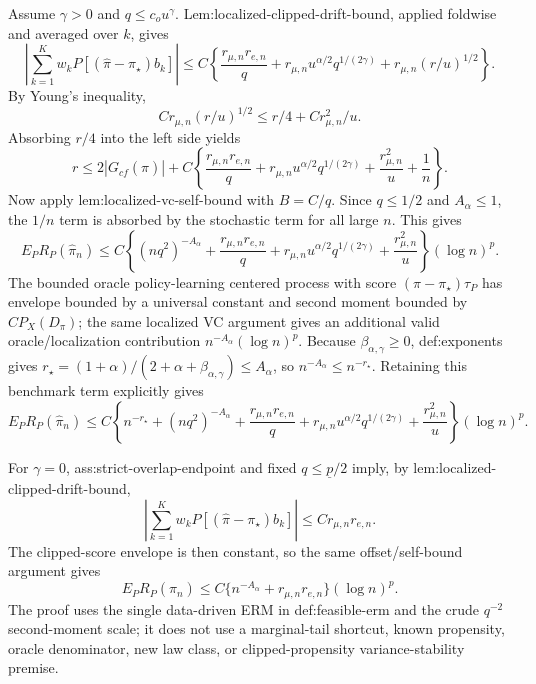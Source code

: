 \documentclass{article}
\begin{document}
Assume \(\gamma>0\) and \(q\le c_ou^\gamma\). Lem:localized-clipped-drift-bound, applied foldwise and averaged over \(k\), gives
\[
\left|\sum_{k=1}^Kw_kP[(\widehat\pi-\pi_\star)b_k]\right|
\le C\left\{\frac{r_{\mu,n}r_{e,n}}q+r_{\mu,n}u^{\alpha/2}q^{1/(2\gamma)}+r_{\mu,n}(r/u)^{1/2}\right\}.
\]
By Young's inequality,
\[
Cr_{\mu,n}(r/u)^{1/2}\le r/4+Cr_{\mu,n}^2/u .
\]
Absorbing \(r/4\) into the left side yields
\[
r\le 2|G_{cf}(\widehat\pi)|+C\left\{\frac{r_{\mu,n}r_{e,n}}q+r_{\mu,n}u^{\alpha/2}q^{1/(2\gamma)}+\frac{r_{\mu,n}^2}{u}+\frac1n\right\}.
\]
Now apply lem:localized-vc-self-bound with \(B=C/q\). Since \(q\le1/2\) and \(A_\alpha\le1\), the \(1/n\) term is absorbed by the stochastic term for all large \(n\). This gives
\[
E_PR_P(\widehat\pi_n)
\le C\left\{(nq^2)^{-A_\alpha}+\frac{r_{\mu,n}r_{e,n}}q+r_{\mu,n}u^{\alpha/2}q^{1/(2\gamma)}+\frac{r_{\mu,n}^2}{u}\right\}(\log n)^p .
\]
The bounded oracle policy-learning centered process with score \((\pi-\pi_\star)\tau_P\) has envelope bounded by a universal constant and second moment bounded by \(CP_X(D_\pi)\); the same localized VC argument gives an additional valid oracle/localization contribution \(n^{-A_\alpha}(\log n)^p\). Because \(\beta_{\alpha,\gamma}\ge0\), def:exponents gives \(r_\star=(1+\alpha)/(2+\alpha+\beta_{\alpha,\gamma})\le A_\alpha\), so \(n^{-A_\alpha}\le n^{-r_\star}\). Retaining this benchmark term explicitly gives
\[
E_PR_P(\widehat\pi_n)
\le C\left\{n^{-r_\star}+(nq^2)^{-A_\alpha}+\frac{r_{\mu,n}r_{e,n}}q+r_{\mu,n}u^{\alpha/2}q^{1/(2\gamma)}+\frac{r_{\mu,n}^2}{u}\right\}(\log n)^p .
\]

For \(\gamma=0\), ass:strict-overlap-endpoint and fixed \(q\le\underline p/2\) imply, by lem:localized-clipped-drift-bound,
\[
\left|\sum_{k=1}^Kw_kP[(\widehat\pi-\pi_\star)b_k]\right|\le Cr_{\mu,n}r_{e,n}.
\]
The clipped-score envelope is then constant, so the same offset/self-bound argument gives
\[
E_PR_P(\widehat\pi_n)\le C\{n^{-A_\alpha}+r_{\mu,n}r_{e,n}\}(\log n)^p .
\]
The proof uses the single data-driven ERM in def:feasible-erm and the crude \(q^{-2}\) second-moment scale; it does not use a marginal-tail shortcut, known propensity, oracle denominator, new law class, or clipped-propensity variance-stability premise.
\end{document}
